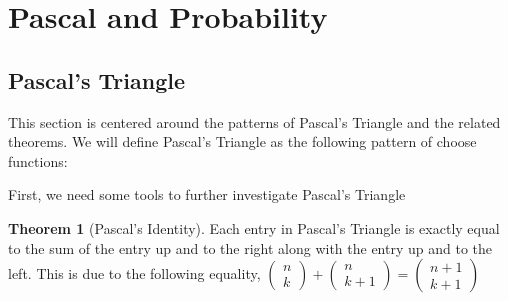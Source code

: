 \documentclass[11pt]{article}
\theoremstyle{definition}
\newtheorem{theorem}{Theorem}[section]
\begin{document}
\section{Pascal and Probability}
\subsection{Pascal's Triangle}
This section is centered around the patterns of Pascal's Triangle and the related theorems. We will define Pascal's Triangle as the following pattern of choose functions:
\begin{figure}[H]
\centering
\begin{subfigure}
    \centering
{}
\end{subfigure}
\begin{subfigure}
    \centering
{}
\end{subfigure}
\end{figure}
First, we need some tools to further investigate Pascal's Triangle
\begin{theorem}[Pascal's Identity] Each entry in Pascal's Triangle is exactly equal to the sum of the entry up and to the right along with the entry up and to the left. This is due to the following equality,
    $
        \begin{pmatrix} n \\ k \end{pmatrix}
        +\begin{pmatrix} n \\ k+1 \end{pmatrix}
        =\begin{pmatrix} n+1 \\ k+1 \end{pmatrix}
    $
\end{theorem}
\end{document}
